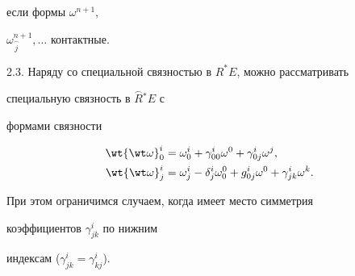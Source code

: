 если формы $\omega^{n+1}$,


$\omega_{\overset{\frown}{j}{}}^{n+1}, \dotsc$ контактные.


\medskip





2.3. Наряду со специальной связностью в $R^ * E$, можно рассматривать


специальную связность в $\overset{\frown}{R}{}^ * E$ с


формами связности


\begin{align*}


{\wt {\wt \omega}}_0^i&=\omega_0^i+\gamma_{00}^i


\omega^0+\gamma_{0j}^i \omega^j, \\


{\wt {\wt \omega}}_j^i&=\omega_j^i-\delta_j^i


\omega_0^0+g_{0j}^i \omega^0+\gamma_{jk}^i \omega^k. 


\end{align*}


При этом ограничимся случаем, когда имеет место симметрия 


коэффициентов $\gamma_{jk}^i$ по нижним


индексам (${\gamma_{jk}^i=\gamma_{kj}^i}$).





